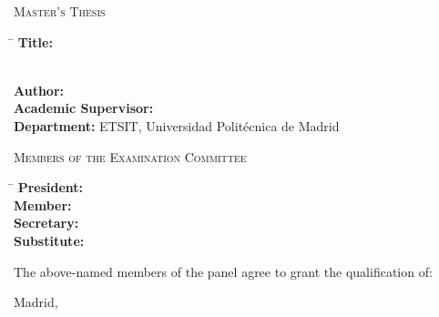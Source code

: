 \thispagestyle{fancy}
\vspace*{1cm}
\colorbox{nar}{\parbox{\dimexpr\textwidth-2\fboxsep}{\Large\textsc{\tfmdegree}}}
\vspace{0.8cm}

\colorbox{nar}{\parbox{\dimexpr\textwidth-2\fboxsep}{\Large\textsc{Master's Thesis}}}
\vspace{0.4cm}

\begin{tabbing}
\hspace{5.3cm}\= \kill
\textbf{Title:}              \> \parbox[t]{10.5cm}{\tfmtitle}\\[0.4cm]
\textbf{Author:}             \> \tfmauthor \\[0.3cm]
\textbf{Academic Supervisor:}\> \tfmsupervisor \\[0.3cm]
\textbf{Department:}         \> ETSIT, Universidad Politécnica de Madrid \\
\end{tabbing}
\vspace{1cm}

\colorbox{nar}{\parbox{\dimexpr\textwidth-2\fboxsep}{\Large\textsc{Members of the Examination Committee}}}
\vspace{0.4cm}

\begin{tabbing}
\hspace{3.2cm}\= \kill
\textbf{President:} \> \makebox[9.5cm]{\dotfill} \\[0.35cm]
\textbf{Member:}    \> \makebox[9.5cm]{\dotfill} \\[0.35cm]
\textbf{Secretary:} \> \makebox[9.5cm]{\dotfill} \\[0.35cm]
\textbf{Substitute:}\> \makebox[9.5cm]{\dotfill} \\
\end{tabbing}
\vspace{1cm}

\noindent The above-named members of the panel agree to grant the qualification of: \dotfill
\vspace{2cm}

\begin{flushright}
Madrid, \dotfill\ \tfmyear
\end{flushright}
\newpage
